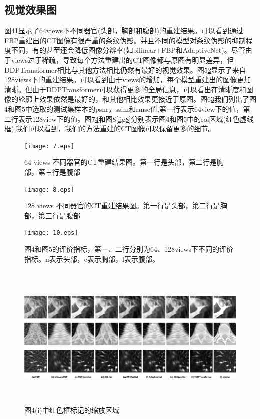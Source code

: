 \subsection{视觉效果图}
图4\ref{fig4}显示了64views下不同器官(头部，胸部和腹部)的重建结果。可以看到通过FBP重建出的CT图像有很严重的条纹伪影。并且不同的模型对条纹伪影的抑制程度不同，有的甚至还会降低图像分辨率(如bilinear+FBP和AdaptiveNet)。尽管由于views过于稀疏，导致每个方法重建出的CT图像都与原图有明显差异，但DDPTransformer相比与其他方法相比仍然有最好的视觉效果。图5\ref{fig5}显示了来自128views下的重建结果。可以看到由于views的增加，每个模型重建出的图像更加清晰。但由于DDPTransformer可以获得更多的全局信息，可以看出在清晰度和图像的轮廓上效果依然是最好的，和其他相比效果更接近于原图。图6\ref{fig6}我们列出了图4和图5中选取的测试集样本的psnr，ssim和rmse值,第一行表示64view下的值，第二行表示128view下的值。图7\ref{fig7}和图8\ref{fig8}分别表示图4和图5中的roi区域(红色虚线框),我们可以看到，我们的方法重建的CT图像可以保留更多的细节。\par
\begin{figure}
	\centering
	\texttt{[image: 7.eps]}
	\caption{64 views 不同器官的CT重建结果图。第一行是头部，第二行是胸部，第三行是腹部}
	\label{fig4}
\end{figure}
\begin{figure}
	\centering
	\texttt{[image: 8.eps]}
	\caption{128 views 不同器官的CT重建结果图。第一行是头部，第二行是胸部，第三行是腹部}
	\label{fig5}
\end{figure}
\begin{figure}
	\centering
	\texttt{[image: 10.eps]}
	\caption{图4和图5的评价指标，第一、二行分别为64、128views下不同的评价指标。n表示头部，c表示胸部，l表示腹部。}
	\label{fig6}
\end{figure}
\begin{figure}
	\centering
	\includegraphics[height=7cm,width=18cm]{14.eps}
	\caption{图4(i)中红色框标记的缩放区域}
	\label{fig7}
\end{figure}

